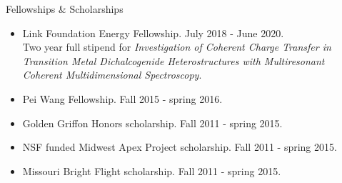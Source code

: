 \documentclass{resume} %
\begin{document}
\iffalse
\begin{rSection}{Teaching Experience}
	
	\begin{rSubsectionlistless}{Physical Chemistry: Thermodynamics}{Fall 2016}{Teaching Assistant for Prof. Gilbert M. Nathanson }{Madison, WI}
	\end{rSubsectionlistless}
	
	\begin{rSubsectionlistless}{General Chemistry}{Fall 2015 - spring 2016}{Teaching Assistant for Prof. Ive Herman and Dr. Paul Hooker}{Madison, WI}
	\end{rSubsectionlistless}
	
	\begin{rSubsectionlistless}{Organic Chemistry II}{Fall 2013}{Teaching Assistant for Prof. Steven P. Lorimor}{Saint Joseph, MO}
	\end{rSubsectionlistless}
	
\end{rSection}
\fi



\begin{rSection}{Fellowships \& Scholarships}
	
\begin{itemize}[leftmargin = 0 pt]
	\item Link Foundation Energy Fellowship. July 2018 - June 2020. \\
	Two year full stipend for \emph{Investigation of Coherent Charge Transfer in Transition Metal Dichalcogenide Heterostructures with Multiresonant Coherent Multidimensional Spectroscopy}.
	\item Pei Wang Fellowship. Fall 2015 - spring 2016.
	\item Golden Griffon Honors scholarship. Fall 2011 - spring 2015.
	\item NSF funded Midwest Apex Project scholarship. Fall 2011 - spring 2015.
	\item Missouri Bright Flight scholarship. Fall 2011 - spring 2015.
\end{itemize}
	
\end{rSection}
\end{document}
